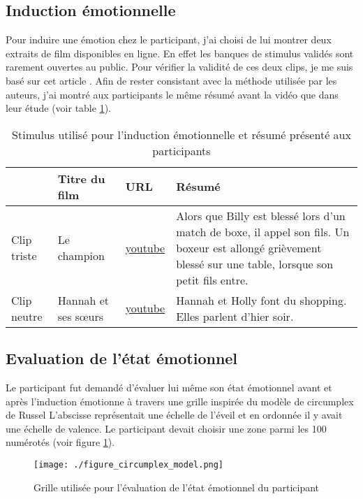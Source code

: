 \documentclass{article}
\begin{document}
\subsection{Induction émotionnelle}
Pour induire une émotion chez le participant, j'ai choisi de lui montrer deux extraits de film disponibles en ligne. En effet les banques de stimulus validés sont rarement ouvertes au public. Pour vérifier la validité de ces deux clips, je me suis basé sur cet article \cite{emotional_film}. Afin de rester consistant avec la méthode utilisée par les auteurs, j'ai montré aux participants le même résumé avant la vidéo que dans leur étude (voir table \ref{film}).

\begin{table}[htbp]
    \centering
    \begin{tabularx}{\textwidth}{|l|l|l|X|}
        \hline
        ~ & Titre du film & URL & Résumé \\ \hline
        Clip triste & Le champion & \href{https://www.youtube.com/watch?v=oxfwLIKTyFk}{youtube} & Alors que Billy est blessé lors d'un match de boxe, il appel son fils. Un boxeur est allongé grièvement blessé sur une table, lorsque son petit fils entre. \\ \hline
        Clip neutre & Hannah et ses sœurs & \href{https://www.youtube.com/watch?v=Jwm4DPCje1U}{youtube} & Hannah et Holly font du shopping. Elles parlent d'hier soir. \\ \hline
    \end{tabularx}
    \caption{Stimulus utilisé pour l'induction émotionnelle et résumé présenté aux participants}
    \label{film}
\end{table}

\subsection{Evaluation de l'état émotionnel}
Le participant fut demandé d'évaluer lui même son état émotionnel avant et après l'induction émotionne à travers une grille inspirée du modèle de circumplex de Russel \cite{posner_russell_peterson_2005} L'abscisse
représentait une échelle de l'éveil et en ordonnée il y avait une échelle de valence. Le participant devait choisir une zone parmi les 100 numérotés (voir figure \ref{russel}).

\begin{figure}[htbp]
    \centering
    \texttt{[image: ./figure\_circumplex\_model.png]}
    \caption{Grille utilisée pour l'évaluation de l'état émotionnel du participant}
    \label{russel}
\end{figure}
\end{document}

